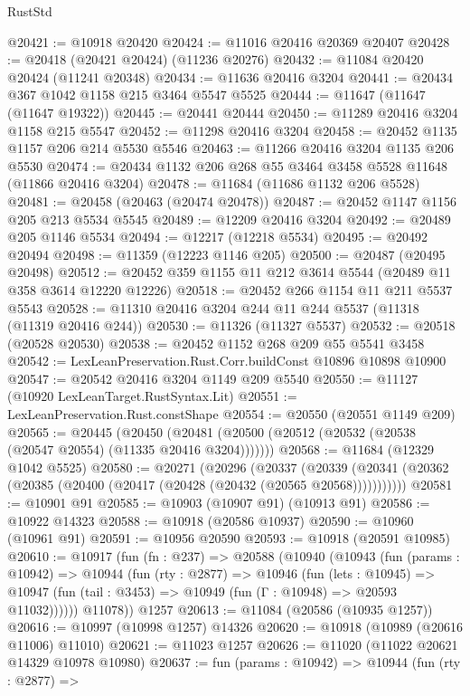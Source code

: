 \begin{lexlean}{RustStd}
\begin{coremodule}
{{{{{{{{{{{{{{{{{{{@20421 := @10918 @20420
@20424 := @11016 @20416 @20369 @20407
@20428 := @20418 (@20421 @20424) (@11236 @20276)
@20432 := @11084 @20420 @20424 (@11241 @20348)
@20434 := @11636 @20416 @3204
@20441 := @20434 @367 @1042 @1158 @215 @3464 @5547 @5525
@20444 := @11647 (@11647 (@11647 @19322))
@20445 := @20441 @20444
@20450 := @11289 @20416 @3204 @1158 @215 @5547
@20452 := @11298 @20416 @3204
@20458 := @20452 @1135 @1157 @206 @214 @5530 @5546
@20463 := @11266 @20416 @3204 @1135 @206 @5530
@20474 := @20434 @1132 @206 @268 @55 @3464 @3458 @5528 @11648 (@11866 @20416 @3204)
@20478 := @11684 (@11686 @1132 @206 @5528)
@20481 := @20458 (@20463 (@20474 @20478))
@20487 := @20452 @1147 @1156 @205 @213 @5534 @5545
@20489 := @12209 @20416 @3204
@20492 := @20489 @205 @1146 @5534
@20494 := @12217 (@12218 @5534)
@20495 := @20492 @20494
@20498 := @11359 (@12223 @1146 @205)
@20500 := @20487 (@20495 @20498)
@20512 := @20452 @359 @1155 @11 @212 @3614 @5544 (@20489 @11 @358 @3614 @12220 @12226)
@20518 := @20452 @266 @1154 @11 @211 @5537 @5543
@20528 := @11310 @20416 @3204 @244 @11 @244 @5537 (@11318 (@11319 @20416 @244))
@20530 := @11326 (@11327 @5537)
@20532 := @20518 (@20528 @20530)
@20538 := @20452 @1152 @268 @209 @55 @5541 @3458
@20542 := LexLeanPreservation.Rust.Corr.buildConst @10896 @10898 @10900
@20547 := @20542 @20416 @3204 @1149 @209 @5540
@20550 := @11127 (@10920 LexLeanTarget.RustSyntax.Lit)
@20551 := LexLeanPreservation.Rust.constShape
@20554 := @20550 (@20551 @1149 @209)
@20565 := @20445
    (@20450 (@20481 (@20500 (@20512 (@20532 (@20538 (@20547 @20554) (@11335 @20416 @3204)))))))
@20568 := @11684 (@12329 @1042 @5525)
@20580 := @20271
    (@20296
      (@20337
        (@20339 (@20341 (@20362 (@20385 (@20400 (@20417 (@20428 (@20432 (@20565 @20568)))))))))))
@20581 := @10901 @91
@20585 := @10903 (@10907 @91) (@10913 @91)
@20586 := @10922 @14323
@20588 := @10918 (@20586 @10937)
@20590 := @10960 (@10961 @91)
@20591 := @10956 @20590
@20593 := @10918 (@20591 @10985)
@20610 := @10917
    (fun (fn : @237) =>
    @20588
      (@10940
        (@10943
          (fun (params : @10942) =>
          @10944
            (fun (rty : @2877) =>
            @10946
              (fun (lets : @10945) =>
              @10947 (fun (tail : @3453) => @10949 (fun (Γ : @10948) => @20593 @11032))))))
        @11078))
    @1257
@20613 := @11084 (@20586 (@10935 @1257))
@20616 := @10997 (@10998 @1257) @14326
@20620 := @10918 (@10989 (@20616 @11006) @11010)
@20621 := @11023 @1257
@20626 := @11020 (@11022 @20621 @14329 @10978 @10980)
@20637 := fun (params : @10942) =>
  @10944
    (fun (rty : @2877) =>
}}}}}}}}}}}}}}}}}}}
\end{coremodule}
\end{lexlean}
